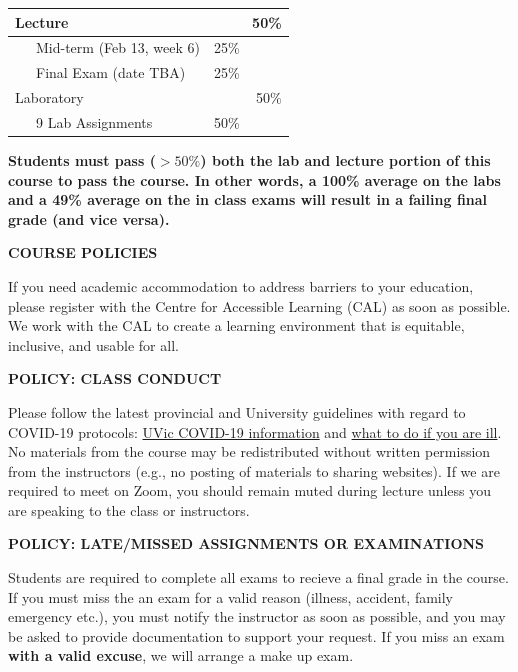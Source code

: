 \documentclass[11pt]{article}
\begin{document}
\begin{center}
		\begin{tabular}{ lr }
			Lecture                     & 50\%       \\
			\hline
			~~~Mid-term (Feb 13, week 6)  & 25\%~~~~~~ \\
			~~~Final Exam (date TBA) & 25\%~~~~~~ \\
			Laboratory                  & 50\%       \\
			\hline
			~~~9 Lab Assignments    & 50\%~~~~~~  \\
		\end{tabular}
\end{center}

\textbf{Students must pass ($>50\%$) both the lab and lecture portion of this course to pass the course. In other words, a 100\% average on the labs and a 49\% average on the in class exams will result in a failing final grade (and vice versa).}

\begin{center}
  \textbf{COURSE POLICIES}
\end{center}

If you need academic accommodation to address barriers to your education, please register with the Centre for Accessible Learning (CAL) as soon as possible. We work with the CAL to create a learning environment that is equitable, inclusive, and usable for all.

\textbf{POLICY: CLASS CONDUCT}

Please follow the latest provincial and University guidelines with regard to COVID-19 protocols: \href{https://www.uvic.ca/covid19/index.php}{UVic COVID-19 information} and \href{https://www.uvic.ca/covid19/health-safety/index.php#ipn-if-you-re-sick}{what to do if you are ill}. No materials from the course may be redistributed without written permission from the instructors (e.g., no posting of materials to sharing websites). If we are required to meet on Zoom, you should remain muted during lecture unless you are speaking to the class or instructors.

\textbf{POLICY: LATE/MISSED ASSIGNMENTS OR EXAMINATIONS}

Students are required to complete all exams to recieve a final grade in the course. If you must miss the an exam for a valid reason (illness, accident, family emergency etc.), you must notify the instructor as soon as possible, and you may be asked to provide documentation to support your request. If you miss an exam \textbf{with a valid excuse}, we will arrange a make up exam.
\end{document}
